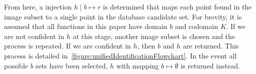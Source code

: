 \newcommand{\smapsto}{\! \mapsto \!}
From here, a injection $h \mid b \smapsto r$ is determined that maps each point found in the image subset to a single
point in the database candidate set.
For brevity, it is assumed that all functions in this paper have domain $b$ and codomain $K$.
If we are not confident in $h$ at this stage, another image subset is chosen and the process is repeated.
If we are confident in $h$, then $b$ and $h$ are returned.
This process is detailed in~\autoref{figure:unifiedIdentificationFlowchart}.
In the event all possible $b$ sets have been selected, $h$ with mapping $b \smapsto \emptyset$ is returned instead.



